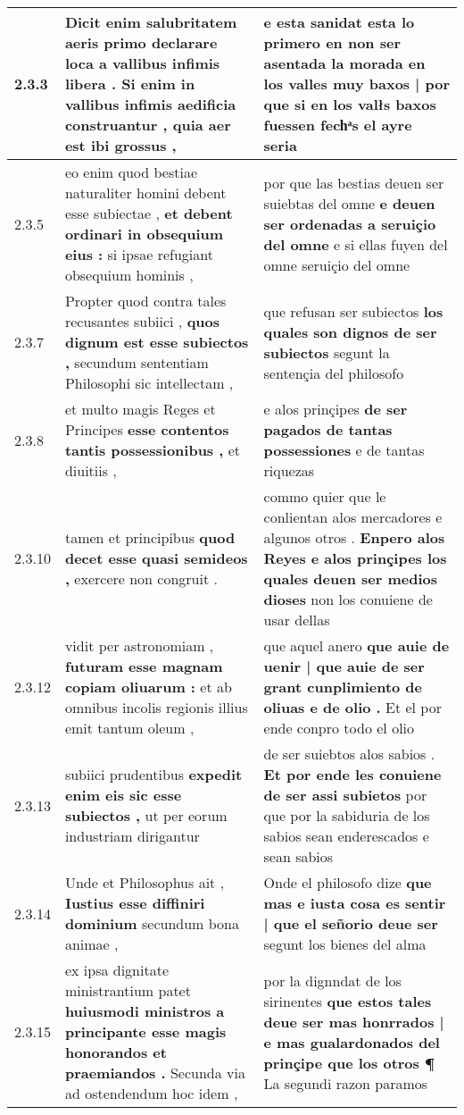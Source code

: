 \begin{tabular}{|p{1cm}|p{6.5cm}|p{6.5cm}|}
2.3.3 & Dicit enim salubritatem aeris primo \textbf{ declarare loca a vallibus infimis libera . Si enim in vallibus infimis aedificia construantur , } quia aer est ibi grossus , & e esta sanidat esta lo primero \textbf{ en non ser asentada la morada en los valles muy baxos | por que si en los valłs baxos fuessen fechͣs } el ayre seria \\\hline
2.3.5 & eo enim quod bestiae naturaliter homini debent esse subiectae , \textbf{ et debent ordinari in obsequium eius : } si ipsae refugiant obsequium hominis , & por que las bestias deuen ser suiebtas del omne \textbf{ e deuen ser ordenadas a seruiçio del omne } e si ellas fuyen del omne seruiçio del omne \\\hline
2.3.7 & Propter quod contra tales recusantes subiici , \textbf{ quos dignum est esse subiectos , } secundum sententiam Philosophi sic intellectam , & que refusan ser subiectos \textbf{ los quales son dignos de ser subiectos } segunt la sentençia del philosofo \\\hline
2.3.8 & et multo magis Reges et Principes \textbf{ esse contentos tantis possessionibus , } et diuitiis , & e alos prinçipes \textbf{ de ser pagados de tantas possessiones } e de tantas riquezas \\\hline
2.3.10 & tamen et principibus \textbf{ quod decet esse quasi semideos , } exercere non congruit . & commo quier que le conlientan alos mercadores e algunos otros . \textbf{ Enpero alos Reyes e alos prinçipes los quales deuen ser medios dioses } non los conuiene de usar dellas \\\hline
2.3.12 & vidit per astronomiam , \textbf{ futuram esse magnam copiam oliuarum : } et ab omnibus incolis regionis illius emit tantum oleum , & que aquel anero \textbf{ que auie de uenir | que auie de ser grant cunplimiento de oliuas e de olio . } Et el por ende conpro todo el olio \\\hline
2.3.13 & subiici prudentibus \textbf{ expedit enim eis sic esse subiectos , } ut per eorum industriam dirigantur & de ser suiebtos alos sabios . \textbf{ Et por ende les conuiene de ser assi subietos } por que por la sabiduria de los sabios sean enderescados e sean sabios \\\hline
2.3.14 & Unde et Philosophus ait , \textbf{ Iustius esse diffiniri dominium } secundum bona animae , & Onde el philosofo dize \textbf{ que mas e iusta cosa es sentir | que el señorio deue ser } segunt los bienes del alma \\\hline
2.3.15 & ex ipsa dignitate ministrantium patet \textbf{ huiusmodi ministros a principante esse magis honorandos et praemiandos . } Secunda via ad ostendendum hoc idem , & por la dignndat de los sirinentes \textbf{ que estos tales deue ser mas honrrados | e mas gualardonados del prinçipe que los otros ¶ } La segundi razon paramos \\\hline

\end{tabular}
